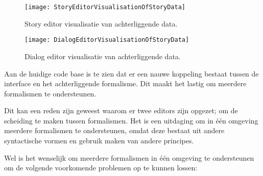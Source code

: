 
\begin{figure}[htb]
    \centering
    \texttt{[image: StoryEditorVisualisationOfStoryData]}
    \caption{Story editor visualisatie van achterliggende data.}
    \label{fig:storyeditorvisualisationofstorydata}
\end{figure}

\begin{figure}[htb]
    \centering
    \texttt{[image: DialogEditorVisualisationOfStoryData]}
    \caption{Dialog editor visualisatie van achterliggende data.}
    \label{fig:dialogeditorvisualisationofstorydata}
\end{figure}

Aan de huidige code base is te zien dat er een nauwe koppeling bestaat tussen de interface en het achterliggende formalisme. Dit maakt het lastig om meerdere formalismen te ondersteunen.

Dit kan een reden zijn geweest waarom er twee editors zijn opgezet; om de scheiding te maken tussen formalismen. Het is een uitdaging om in één omgeving meerdere formalismen te ondersteunen, omdat deze bestaat uit andere syntactische vormen en gebruik maken van andere principes.

Wel is het wenselijk om meerdere formalismen in één omgeving te ondersteunen om de volgende voorkomende problemen op te kunnen lossen:

